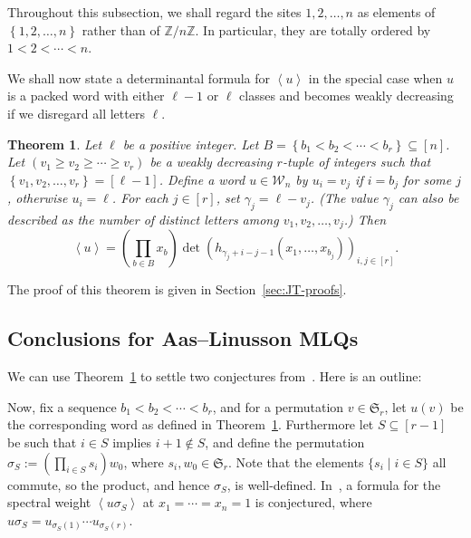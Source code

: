 \documentclass[reqno]{amsart}
\newcommand{\0}{\phantom{c}}
\newcommand{\swt}[1]{\left\langle #1 \right\rangle} %
\newcommand{\SymGp}[1]{\mathfrak{S}_{#1}} %
\newcommand{\mcW}{\mathcal{W}}
\newcommand{\ZZ}{\mathbb{Z}}
\let\prodnonlimits\prod
\renewcommand{\prod}{\prodnonlimits\limits}
\newcommand{\set}[1]{\left\{ #1 \right\}}
\newcommand{\tup}[1]{\left( #1 \right)}
\newcommand{\ive}[1]{\left[ #1 \right]}
\theoremstyle{plain}
\newtheorem{thm}{Theorem}[section]
\theoremstyle{definition}
\numberwithin{equation}{section}
\newcommand{\darij}[1]{\todo[size=\tiny,color=red!30]{#1 \\ \hfill --- Darij}}
\newcommand{\travis}[1]{\todo[size=\tiny,color=blue!30]{#1 \\ \hfill --- Travis}}
\begin{document}
Throughout this subsection, we shall regard the sites $1, 2, \ldots, n$ as elements of $\set{1, 2, \ldots, n}$ rather than of $\ZZ/n\ZZ$.
In particular, they are totally ordered by $1 < 2 < \cdots < n$.

We shall now state a determinantal formula for $\swt{u}$ in the special case when $u$ is a packed word with either $\ell-1$ or $\ell$ classes and becomes weakly decreasing if we disregard all letters $\ell$.

\begin{thm}
\label{thm:determinant_form}
Let $\ell$ be a positive integer.
Let $B = \set{ b_1 < b_2 < \cdots < b_r} \subseteq \ive{n}$.
Let $\tup{v_1 \geq v_2 \geq \cdots \geq v_r}$ be a weakly decreasing $r$-tuple of integers such that $\set{v_1, v_2, \ldots, v_r} = \ive{\ell-1}$.
Define a word $u \in \mcW_n$ by $u_i=v_j$ if $i = b_j$ for some $j$, otherwise $u_i = \ell$.
For each $j \in \ive{r}$, set $\gamma_j = \ell - v_j$.
(The value $\gamma_j$ can also be described as the number of distinct letters among $v_1, v_2, \dotsc, v_j$.)
Then
\[
\swt{u} = \left(  \prod_{b \in B} x_b \right)  \det \left(  h_{\gamma_j+i-j-1}(x_1,\dotsc,x_{b_j}) \right)_{i, j \in \ive{r}}.
\]
\end{thm}

The proof of this theorem is given in Section~\ref{sec:JT-proofs}.




\subsection{Conclusions for Aas--Linusson MLQs}

We can use Theorem~\ref{thm:determinant_form} to settle two conjectures from~\cite{AasLin17}. Here is an outline:

Now, fix a sequence $b_1 < b_2 < \cdots < b_r$, and for a permutation $v \in \SymGp{r}$, let $u(v)$ be the corresponding word as defined in Theorem~\ref{thm:determinant_form}.
Furthermore let $S \subseteq \ive{r-1}$ be such that $i\in S$ implies $i+1 \notin S$, and define the permutation $\sigma_S := \left( \prod_{i \in S} s_i \right) w_0$, where $s_i, w_0 \in \SymGp{r}$.
Note that the elements $\{s_i \mid i \in S\}$ all commute, so the product, and hence $\sigma_S$, is well-defined.
In~\cite[Conj.~3.10]{AasLin17}, a formula for the spectral weight $\swt{u \sigma_S}$ at $x_1 = \cdots = x_n = 1$ is conjectured, where $u \sigma_S = u_{\sigma_S(1)} \cdots u_{\sigma_S(r)}$.
\end{document}
